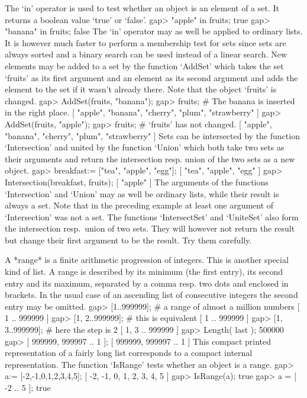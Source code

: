 The `in' operator is  used  to test whether an  object is an element of a
set.  It returns a boolean value `true' or `false'.
\beginexample
    gap> "apple" in fruits;
    true
    gap> "banana" in fruits;
    false 
\endexample
The `in' operator may as well be applied to ordinary lists. It is however
much faster to perform  a membership test for sets  since sets are always
sorted and a binary  search can be used instead  of a linear search.  New
elements may be added to a  set by the function  `AddSet' which takes the
set `fruits' as its first argument and an  element as its second argument
and adds the element to the set if it wasn't already there. Note that the
object `fruits' is changed.
\beginexample
    gap> AddSet(fruits, "banana");
    gap> fruits;  #  The banana is inserted in the right place.
    [ "apple", "banana", "cherry", "plum", "strawberry" ]
    gap> AddSet(fruits, "apple");
    gap> fruits;  #  `fruits' has not changed.
    [ "apple", "banana", "cherry", "plum", "strawberry" ] 
\endexample
Sets can be intersected by the function `Intersection'  and united by the
function `Union' which both take  two sets as their arguments  and return
the intersection resp. union of the two sets as a new object.
\beginexample
    gap> breakfast:= ["tea", "apple", "egg"];
    [ "tea", "apple", "egg" ]
    gap> Intersection(breakfast, fruits);
    [ "apple" ] 
\endexample
The arguments of the functions `Intersection' and `Union'  may as well be
ordinary lists,  while  their result is  always  a set. Note that  in the
preceding example at least one argument of  `Intersection' was not a set.
The functions `IntersectSet'  and `UniteSet'  also form the  intersection
resp.~union  of  two sets. They  will  however not return  the result but
change their first argument to be the result. Try them carefully.


A *range* is a finite arithmetic progression of integers. This is another
special kind   of list. A range  is  described by its minimum  (the first
entry), its second entry and its maximum, separated  by a comma resp. two
dots and enclosed in brackets. In the usual case  of an ascending list of
consecutive integers the second entry may be omitted.
\beginexample
    gap> [1..999999];     #  a range of almost a million numbers
    [ 1 .. 999999 ]
    gap> [1, 2..999999];  #  this is equivalent
    [ 1 .. 999999 ]
    gap> [1, 3..999999];  #  here the step is 2
    [ 1, 3 .. 999999 ]
    gap> Length( last );
    500000
    gap> [ 999999, 999997 .. 1 ];
    [ 999999, 999997 .. 1 ]
\endexample
This compact printed representation of a fairly long  list corresponds to
a  compact internal representation.  The function `IsRange' tests whether
an object is a range.
\beginexample
    gap> a:= [-2,-1,0,1,2,3,4,5];
    [ -2, -1, 0, 1, 2, 3, 4, 5 ]
    gap> IsRange(a);
    true
    gap> a = [ -2 .. 5 ];
    true
\endexample

